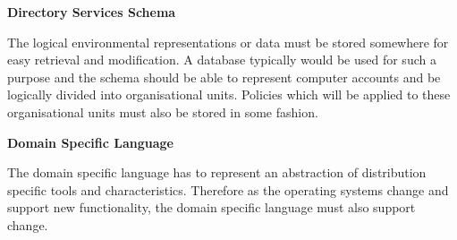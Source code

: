 	\large{\bfseries{Directory Services Schema}}		
	
	\vspace{2mm}
	\normalsize
	{
		The logical environmental representations or data must be stored somewhere for easy retrieval and modification.  
		A database typically would be used for such a purpose and the schema should be able to represent computer accounts 
		and be logically divided into organisational units.  Policies which will be applied to these organisational units must 
		also be stored in some fashion.
		\newline
	}
	
	\large{\bfseries{Domain Specific Language}}	
	
	\vspace{2mm}
	\normalsize
	{
		The domain specific language has to represent an abstraction of distribution specific tools and characteristics.  
		Therefore as the operating systems change and support new functionality, the domain specific language 
		must also support change. 
	}
